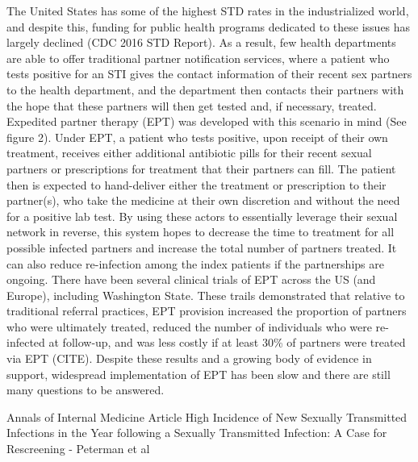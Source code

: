 \documentclass [11pt, proquest] {uwthesis}[2015/03/03]
\begin{document}
The United States has some of the highest STD rates in the
industrialized world, and despite this, funding for public health
programs dedicated to these issues has largely declined (CDC 2016 STD
Report). As a result, few health departments are able to offer
traditional partner notification services, where a patient who tests
positive for an STI gives the contact information of their recent sex
partners to the health department, and the department then contacts
their partners with the hope that these partners will then get tested
and, if necessary, treated. Expedited partner therapy (EPT) was
developed with this scenario in mind (See figure 2). Under EPT, a
patient who tests positive, upon receipt of their own treatment,
receives either additional antibiotic pills for their recent sexual
partners or prescriptions for treatment that their partners can fill.
The patient then is expected to hand-deliver either the treatment or
prescription to their partner(s), who take the medicine at their own
discretion and without the need for a positive lab test. By using these
actors to essentially leverage their sexual network in reverse, this
system hopes to decrease the time to treatment for all possible infected
partners and increase the total number of partners treated. It can also
reduce re-infection among the index patients if the partnerships are
ongoing. There have been several clinical trials of EPT across the US
(and Europe), including Washington State. These trails demonstrated that
relative to traditional referral practices, EPT provision increased the
proportion of partners who were ultimately treated, reduced the number
of individuals who were re-infected at follow-up, and was less costly if
at least 30\% of partners were treated via EPT (CITE). Despite these
results and a growing body of evidence in support, widespread
implementation of EPT has been slow and there are still many questions
to be answered.

Annals of Internal Medicine Article High Incidence of New Sexually
Transmitted Infections in the Year following a Sexually Transmitted
Infection: A Case for Rescreening - Peterman et al
\end{document}
